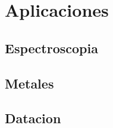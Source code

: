 \documentclass[twocolumn,amssymb,prb,aps,superscriptaddress]{revtex4}
\begin{document}
\section{Aplicaciones}
\label{sec:aplicacion1}

\subsection{Espectroscopia}
\label{sec:aplicacion2}

\subsection{Metales}

\subsection{Datacion}
\end{document}

